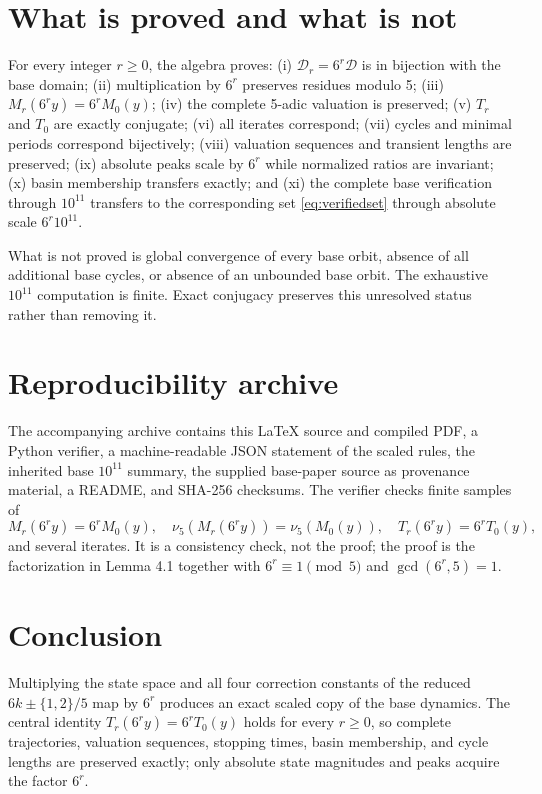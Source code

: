 \documentclass[11pt]{article}
\begin{document}
\section{What is proved and what is not}
For every integer $r\ge0$, the algebra proves: (i) $\mathcal D_r=6^r\mathcal D$ is in bijection with the base domain; (ii) multiplication by $6^r$ preserves residues modulo 5; (iii) $M_r(6^r y)=6^rM_0(y)$; (iv) the complete 5-adic valuation is preserved; (v) $T_r$ and $T_0$ are exactly conjugate; (vi) all iterates correspond; (vii) cycles and minimal periods correspond bijectively; (viii) valuation sequences and transient lengths are preserved; (ix) absolute peaks scale by $6^r$ while normalized ratios are invariant; (x) basin membership transfers exactly; and (xi) the complete base verification through $10^{11}$ transfers to the corresponding set \eqref{eq:verifiedset} through absolute scale $6^r10^{11}$.

What is not proved is global convergence of every base orbit, absence of all additional base cycles, or absence of an unbounded base orbit. The exhaustive $10^{11}$ computation is finite. Exact conjugacy preserves this unresolved status rather than removing it.

\section{Reproducibility archive}
The accompanying archive contains this \LaTeX{} source and compiled PDF, a Python verifier, a machine-readable JSON statement of the scaled rules, the inherited base $10^{11}$ summary, the supplied base-paper source as provenance material, a README, and SHA-256 checksums. The verifier checks finite samples of
\[
M_r(6^r y)=6^rM_0(y),\quad \nu_5(M_r(6^r y))=\nu_5(M_0(y)),\quad T_r(6^r y)=6^rT_0(y),
\]
and several iterates. It is a consistency check, not the proof; the proof is the factorization in Lemma 4.1 together with $6^r\equiv1\pmod5$ and $\gcd(6^r,5)=1$.

\section{Conclusion}
Multiplying the state space and all four correction constants of the reduced $6k\pm\{1,2\}/5$ map by $6^r$ produces an exact scaled copy of the base dynamics. The central identity $T_r(6^r y)=6^rT_0(y)$ holds for every $r\ge0$, so complete trajectories, valuation sequences, stopping times, basin membership, and cycle lengths are preserved exactly; only absolute state magnitudes and peaks acquire the factor $6^r$.
\end{document}
